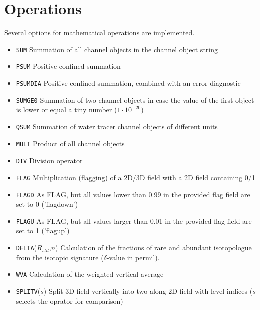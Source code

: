 \documentclass[twoside]{article}
\begin{document}
\section{Operations}
\label{sec:operations}
%
Several options for mathematical operations are implemented.
\begin{itemize}
   \item{\tt SUM} Summation of all channel objects in the channel object string
   \item{\tt PSUM} Positive confined summation
   \item{\tt PSUMDIA} Positive confined summation, combined with an error diagnostic
   \item{\tt SUMGE0} Summation of two channel objects in case the value of the first object is lower or equal a tiny number ($1\cdot10^{-20}$)
   \item{\tt QSUM} Summation of water tracer channel objects of different units
   \item{\tt MULT} Product of all channel objects
   \item{\tt DIV} Division operator
   \item{\tt FLAG} Multiplication (flagging) of a 2D/3D field with a 2D field containing 0/1
   \item{\tt FLAGD} As FLAG, but all values lower than 0.99 in the provided flag field are set to 0 ('flagdown')
   \item{\tt FLAGU} As FLAG, but all values larger than 0.01 in the provided flag field are set to 1  ('flagup')
   \item{\tt DELTA}($R_{std}$,$n$) Calculation of the fractions of rare and
     abundant isotopologue from the isotopic signature ($\delta$-value in
     permil).
   \item{\tt WVA} Calculation of the weighted vertical average
   \item{\tt SPLITV}($s$) Split 3D field vertically into two along 2D field with
     level indices ($s$ selects the oprator for comparison)
\end{itemize}

\end{document}
